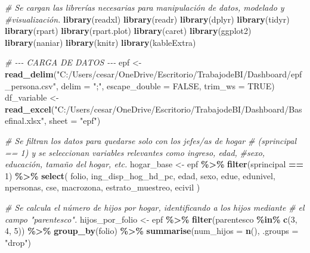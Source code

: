 \documentclass[
]{article}
\newenvironment{Shaded}{\begin{snugshade}}{\end{snugshade}}
\newcommand{\AttributeTok}[1]{\textcolor[rgb]{0.13,0.29,0.53}{#1}}
\newcommand{\CommentTok}[1]{\textcolor[rgb]{0.56,0.35,0.01}{\textit{#1}}}
\newcommand{\ConstantTok}[1]{\textcolor[rgb]{0.56,0.35,0.01}{#1}}
\newcommand{\DecValTok}[1]{\textcolor[rgb]{0.00,0.00,0.81}{#1}}
\newcommand{\FunctionTok}[1]{\textcolor[rgb]{0.13,0.29,0.53}{\textbf{#1}}}
\newcommand{\NormalTok}[1]{#1}
\newcommand{\OtherTok}[1]{\textcolor[rgb]{0.56,0.35,0.01}{#1}}
\newcommand{\SpecialCharTok}[1]{\textcolor[rgb]{0.81,0.36,0.00}{\textbf{#1}}}
\newcommand{\StringTok}[1]{\textcolor[rgb]{0.31,0.60,0.02}{#1}}
\begin{document}
\begin{Shaded}
\begin{Highlighting}[]
\CommentTok{\# Se cargan las librerías necesarias para manipulación de datos, modelado y }
\CommentTok{\#visualización.}
\FunctionTok{library}\NormalTok{(readxl)  }
\FunctionTok{library}\NormalTok{(readr)   }
\FunctionTok{library}\NormalTok{(dplyr)   }
\FunctionTok{library}\NormalTok{(tidyr)   }
\FunctionTok{library}\NormalTok{(rpart)   }
\FunctionTok{library}\NormalTok{(rpart.plot) }
\FunctionTok{library}\NormalTok{(caret)   }
\FunctionTok{library}\NormalTok{(ggplot2) }
\FunctionTok{library}\NormalTok{(naniar) }
\FunctionTok{library}\NormalTok{(knitr)   }
\FunctionTok{library}\NormalTok{(kableExtra)  }

\CommentTok{\# {-}{-}{-} CARGA DE DATOS {-}{-}{-}}
\NormalTok{epf }\OtherTok{\textless{}{-}} \FunctionTok{read\_delim}\NormalTok{(}\StringTok{"C:/Users/cesar/OneDrive/Escritorio/TrabajodeBI/Dashboard/epf\_persona.csv"}\NormalTok{, }\AttributeTok{delim =} \StringTok{";"}\NormalTok{, }
                  \AttributeTok{escape\_double =} \ConstantTok{FALSE}\NormalTok{, }\AttributeTok{trim\_ws =} \ConstantTok{TRUE}\NormalTok{)}
\NormalTok{df\_variable }\OtherTok{\textless{}{-}} \FunctionTok{read\_excel}\NormalTok{(}\StringTok{"C:/Users/cesar/OneDrive/Escritorio/TrabajodeBI/Dashboard/Basefinal.xlsx"}\NormalTok{,}
                          \AttributeTok{sheet =} \StringTok{"epf"}\NormalTok{)}

\CommentTok{\# Se filtran los datos para quedarse solo con los jefes/as de hogar }
\CommentTok{\# (sprincipal == 1) y se seleccionan variables relevantes como ingreso, edad, }
\CommentTok{\#sexo, educación, tamaño del hogar, etc.}
\NormalTok{hogar\_base }\OtherTok{\textless{}{-}}\NormalTok{ epf }\SpecialCharTok{\%\textgreater{}\%}
  \FunctionTok{filter}\NormalTok{(sprincipal }\SpecialCharTok{==} \DecValTok{1}\NormalTok{) }\SpecialCharTok{\%\textgreater{}\%}
  \FunctionTok{select}\NormalTok{(}
\NormalTok{    folio, ing\_disp\_hog\_hd\_pc, edad, sexo, edue, edunivel,}
\NormalTok{    npersonas, cse, macrozona, estrato\_muestreo, ecivil}
\NormalTok{  )}

\CommentTok{\# Se calcula el número de hijos por hogar, identificando a los hijos mediante }
\CommentTok{\# el campo "parentesco".}
\NormalTok{hijos\_por\_folio }\OtherTok{\textless{}{-}}\NormalTok{ epf }\SpecialCharTok{\%\textgreater{}\%}
  \FunctionTok{filter}\NormalTok{(parentesco }\SpecialCharTok{\%in\%} \FunctionTok{c}\NormalTok{(}\DecValTok{3}\NormalTok{, }\DecValTok{4}\NormalTok{, }\DecValTok{5}\NormalTok{)) }\SpecialCharTok{\%\textgreater{}\%}
  \FunctionTok{group\_by}\NormalTok{(folio) }\SpecialCharTok{\%\textgreater{}\%}
  \FunctionTok{summarise}\NormalTok{(}\AttributeTok{num\_hijos =} \FunctionTok{n}\NormalTok{(), }\AttributeTok{.groups =} \StringTok{"drop"}\NormalTok{)}


\end{Highlighting}
\end{Shaded}
\end{document}
